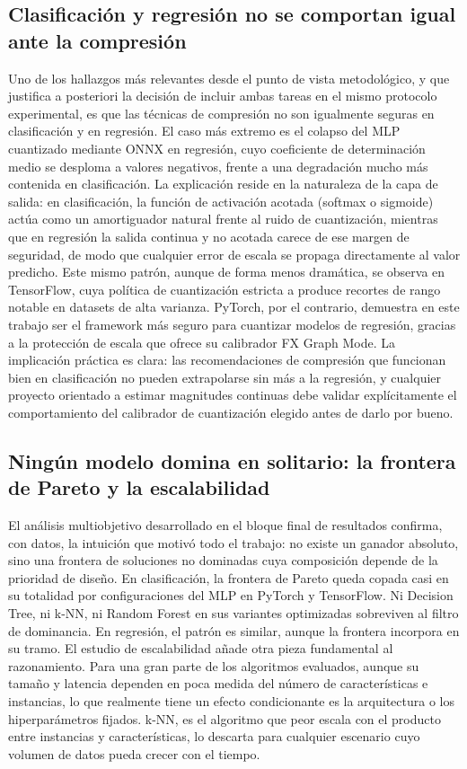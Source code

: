 \documentclass[a4paper,12pt,twoside,final]{book}
\begin{document}
\subsection{Clasificación y regresión no se comportan igual ante la compresión}
Uno de los hallazgos más relevantes desde el punto de vista metodológico, y que justifica a posteriori la decisión de
incluir ambas tareas en el mismo protocolo experimental, es que las técnicas de compresión no son igualmente seguras en
clasificación y en regresión. El caso más extremo es el colapso del MLP cuantizado mediante ONNX en regresión, cuyo
coeficiente de determinación medio se desploma a valores negativos, frente a una degradación mucho más contenida en
clasificación. La explicación reside en la naturaleza de la capa de salida: en clasificación, la función de activación
acotada (softmax o sigmoide) actúa como un amortiguador natural frente al ruido de cuantización, mientras que en
regresión la salida continua y no acotada carece de ese margen de seguridad, de modo que cualquier error de escala se
propaga directamente al valor predicho. Este mismo patrón, aunque de forma menos dramática, se observa en TensorFlow,
cuya política de cuantización estricta a  produce recortes de rango notable en datasets de alta varianza.
PyTorch, por el contrario, demuestra en este trabajo ser el framework más seguro para cuantizar modelos de regresión,
gracias a la protección de escala que ofrece su calibrador FX Graph Mode. La implicación práctica es clara: las
recomendaciones de compresión que funcionan bien en clasificación no pueden extrapolarse sin más a la regresión, y
cualquier proyecto orientado a estimar magnitudes continuas debe validar explícitamente el comportamiento del
calibrador de cuantización elegido antes de darlo por bueno.
 
\subsection{Ningún modelo domina en solitario: la frontera de Pareto y la escalabilidad}
El análisis multiobjetivo desarrollado en el bloque final de resultados confirma, con datos, la intuición que motivó
todo el trabajo: no existe un ganador absoluto, sino una frontera de soluciones no dominadas cuya composición depende
de la prioridad de diseño. En clasificación, la frontera de Pareto queda copada casi en su totalidad por
configuraciones del MLP en PyTorch y TensorFlow. Ni Decision Tree, ni k-NN, ni Random Forest en sus variantes
optimizadas sobreviven al filtro de dominancia. En regresión, el patrón es similar, aunque la frontera incorpora en su
tramo. El estudio de escalabilidad añade otra pieza fundamental al razonamiento. Para una gran parte de los algoritmos
evaluados, aunque su tamaño y latencia dependen en poca medida del número de características e instancias, lo que
realmente tiene un efecto condicionante es la arquitectura o los hiperparámetros fijados.
k-NN, es el algoritmo que peor escala con el producto entre instancias y características, lo descarta para cualquier
escenario cuyo volumen de datos pueda crecer con el tiempo.
 
\end{document}

